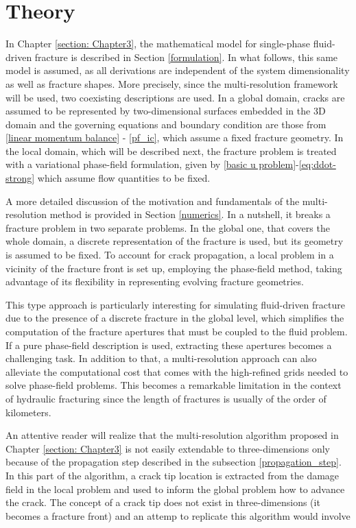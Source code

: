 \section{Theory}
\label{section: Chapter4/theory}

In Chapter \ref{section: Chapter3}, the mathematical model for single-phase fluid-driven fracture is described in Section \ref{formulation}. In what follows, this same model is assumed, as all derivations are independent of the system dimensionality as well as fracture shapes. More precisely, since the multi-resolution framework will be used, two coexisting descriptions are used. In a global domain, cracks are assumed to be represented by two-dimensional surfaces embedded in the 3D domain and the governing equations and boundary condition are those from \eqref{linear momentum balance} - \eqref{pf_ic}, which assume a fixed fracture geometry. In the local domain, which will be described next, the fracture problem is treated with a variational phase-field formulation, given by \eqref{basic u problem}-\eqref{eq:ddot-strong} which assume flow quantities to be fixed.

A more detailed discussion of the motivation and fundamentals of the multi-resolution method is provided in Section \ref{numerics}. In a nutshell, it breaks a fracture problem in two separate problems. In the global one, that covers the whole domain, a discrete representation of the fracture is used, but its geometry is assumed to be fixed. To account for crack propagation, a local problem in a vicinity of the fracture front is set up, employing the phase-field method, taking advantage of its flexibility in representing evolving fracture geometries.

This type approach is particularly interesting for simulating fluid-driven fracture due to the presence of a discrete fracture in the global level, which simplifies the computation of the fracture apertures that must be coupled to the fluid problem. If a pure phase-field description is used, extracting these apertures becomes a challenging task. In addition to that, a multi-resolution approach can also alleviate the computational cost that comes with the high-refined grids needed to solve phase-field problems. This becomes a remarkable limitation in the context of hydraulic fracturing since the length of fractures is usually of the order of kilometers.

An attentive reader will realize that the multi-resolution algorithm proposed in Chapter \ref{section: Chapter3} is not easily extendable to three-dimensions only because of the propagation step described in the subsection \ref{propagation_step}. In this part of the algorithm, a crack tip location is extracted from the damage field in the local problem and used to inform the global problem how to advance the crack. The concept of a crack tip does not exist in three-dimensions (it becomes a fracture front) and an attemp to replicate this algorithm would involve 


